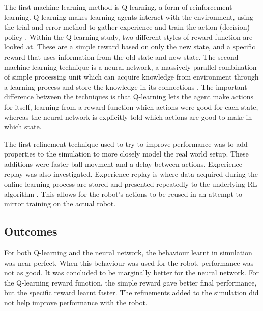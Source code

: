 \documentclass[12pt,a4paper]{article}
\begin{document}
The first machine learning method is Q-learning, a form of reinforcement learning. Q-learning makes learning agents interact with the environment, using the trial-and-error method to gather experience and train the action (decision) policy \cite{nao_balance}. Within the Q-learning study, two different styles of reward function are looked at. These are a simple reward based on only the new state, and a specific reward that uses information from the old state and new state. The second machine learning technique is a neural network, a massively parallel combination of simple processing unit which can acquire knowledge from environment through a learning process and store the knowledge in its connections \cite{nn_def}. The important difference between the techniques is that Q-learning lets the agent make actions for itself, learning from a reward function which actions were good for each state, whereas the neural network is explicitly told which actions are good to make in which state.

The first refinement technique used to try to improve performance was to add properties to the simulation to more closely model the real world setup. These additions were faster ball movment and a delay between actions. Experience replay was also investigated. Experience replay is where data acquired during the online learning process are stored and presented repeatedly to the underlying RL algorithm \cite{er}. This allows for the robot's actions to be reused in an attempt to mirror training on the actual robot.

\subsection{Outcomes}
For both Q-learning and the neural network, the behaviour learnt in simulation was near perfect. When this behaviour was used for the robot, performance was not as good. It was concluded to be marginally better for the neural network. For the Q-learning reward function, the simple reward gave better final performance, but the specific reward learnt faster. The refinements added to the simulation did not help improve performance with the robot. 
\end{document}
